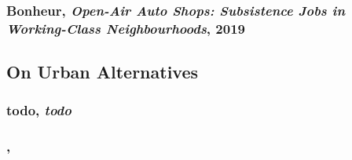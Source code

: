 \documentclass{article}
\begin{document}
\subsubsection{Bonheur, \textit{Open-Air Auto Shops: Subsistence Jobs in Working-Class Neighbourhoods}, 2019}

\subsection{On Urban Alternatives}

\subsubsection{todo, \textit{todo}}

\begin{outline}
	\1
\end{outline}



\subsubsection{, \textit{}}

\begin{outline}
	\1
\end{outline}
\fi
\end{document}
